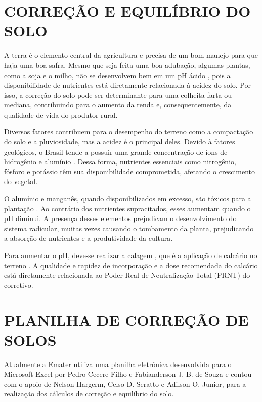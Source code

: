 
\section{CORREÇÃO E EQUILÍBRIO DO SOLO}
\label{subsec:correcaodosolo}

A terra é o elemento central da agricultura e precisa de um bom manejo para que haja uma boa safra. Mesmo que seja feita uma boa adubação, algumas plantas, como a soja e o milho, não se desenvolvem bem em um pH ácido \cite{de2003sugestao}, pois a disponibilidade de nutrientes está diretamente relacionada à acidez do solo. Por isso, a correção do solo pode ser determinante para uma colheita farta ou mediana, contribuindo para o aumento da renda e, consequentemente, da qualidade de vida do produtor rural.

Diversos fatores contribuem para o desempenho do terreno como a compactação do solo e a pluviosidade, mas a acidez é o principal deles. Devido à fatores geológicos, o Brasil tende a possuir uma grande concentração de íons de hidrogênio e alumínio \cite{bookfa2215c6}. Dessa forma, nutrientes essenciais como nitrogênio, fósforo e potássio têm sua disponibilidade comprometida, afetando o crescimento do vegetal.

O alumínio e manganês, quando disponibilizados em excesso, são tóxicos para a plantação \cite{malavolta1980effects}. Ao contrário dos nutrientes supracitados, esses aumentam quando o pH diminui. A presença desses elementos prejudicam o desenvolvimento do sistema radicular, muitas vezes causando o tombamento da planta, prejudicando a absorção de nutrientes e a produtividade da cultura.

Para aumentar o pH, deve-se realizar a calagem , que é a aplicação de calcário no terreno \cite{rossetto}. A qualidade e rapidez de incorporação e a dose recomendada do calcário está diretamente relacionada ao Poder Real de Neutralização Total (PRNT) do corretivo.

\section{PLANILHA DE CORREÇÃO DE SOLOS}
\label{subsec:planilha}

Atualmente a Emater utiliza uma planilha eletrônica desenvolvida para o Microsoft Excel por Pedro Cecere Filho e Fabianderson J. B. de Souza e contou com o apoio de Nelson Hargerm, Celso D. Seratto e Adilson O. Junior, para a realização dos cálculos de correção e equilíbrio do solo.

